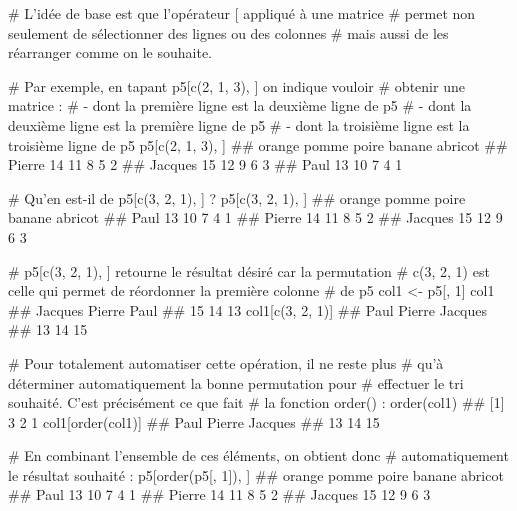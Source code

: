 \documentclass[12pt,twosided, notitlepage]{book}
\newenvironment{Shaded}{}{}
\newcommand{\KeywordTok}[1]{\textcolor[rgb]{0.00,0.00,1.00}{{#1}}}
\newcommand{\DecValTok}[1]{{#1}}
\newcommand{\StringTok}[1]{\textcolor[rgb]{0.00,0.50,0.50}{{#1}}}
\newcommand{\CommentTok}[1]{\textcolor[rgb]{0.00,0.50,0.00}{{#1}}}
\newcommand{\NormalTok}[1]{{#1}}
\renewenvironment{Shaded}{\begin{snugshade}}{\end{snugshade}}
\begin{document}
\begin{enumerate}
\begin{Shaded}
\begin{Highlighting}[]
\CommentTok{# L'idée de base est que l'opérateur [ appliqué à une matrice}
\CommentTok{# permet non seulement de sélectionner des lignes ou des colonnes}
\CommentTok{# mais aussi de les réarranger comme on le souhaite.}

\CommentTok{# Par exemple, en tapant p5[c(2, 1, 3), ] on indique vouloir}
\CommentTok{# obtenir une matrice : }
\CommentTok{# - dont la première ligne est la deuxième ligne de p5}
\CommentTok{# - dont la deuxième ligne est la première ligne de p5}
\CommentTok{# - dont la troisième ligne est la troisième ligne de p5}
\NormalTok{p5[}\KeywordTok{c}\NormalTok{(}\DecValTok{2}\NormalTok{, }\DecValTok{1}\NormalTok{, }\DecValTok{3}\NormalTok{), ]}
  \NormalTok{##         orange pomme poire banane abricot}
  \NormalTok{## Pierre      14    11     8      5       2}
  \NormalTok{## Jacques     15    12     9      6       3}
  \NormalTok{## Paul        13    10     7      4       1}

\CommentTok{# Qu'en est-il de p5[c(3, 2, 1), ] ? }
\NormalTok{p5[}\KeywordTok{c}\NormalTok{(}\DecValTok{3}\NormalTok{, }\DecValTok{2}\NormalTok{, }\DecValTok{1}\NormalTok{), ]}
  \NormalTok{##         orange pomme poire banane abricot}
  \NormalTok{## Paul        13    10     7      4       1}
  \NormalTok{## Pierre      14    11     8      5       2}
  \NormalTok{## Jacques     15    12     9      6       3}

\CommentTok{# p5[c(3, 2, 1), ] retourne le résultat désiré car la permutation}
\CommentTok{# c(3, 2, 1) est celle qui permet de réordonner la première colonne}
\CommentTok{# de p5}
\NormalTok{col1 <-}\StringTok{ }\NormalTok{p5[, }\DecValTok{1}\NormalTok{]}
\NormalTok{col1}
  \NormalTok{## Jacques  Pierre    Paul }
  \NormalTok{##      15      14      13}
\NormalTok{col1[}\KeywordTok{c}\NormalTok{(}\DecValTok{3}\NormalTok{, }\DecValTok{2}\NormalTok{, }\DecValTok{1}\NormalTok{)]}
  \NormalTok{##    Paul  Pierre Jacques }
  \NormalTok{##      13      14      15}

\CommentTok{# Pour totalement automatiser cette opération, il ne reste plus}
\CommentTok{# qu'à déterminer automatiquement la bonne permutation pour }
\CommentTok{# effectuer le tri souhaité. C'est précisément ce que fait}
\CommentTok{# la fonction order() : }
\KeywordTok{order}\NormalTok{(col1)}
  \NormalTok{## [1] 3 2 1}
\NormalTok{col1[}\KeywordTok{order}\NormalTok{(col1)]}
  \NormalTok{##    Paul  Pierre Jacques }
  \NormalTok{##      13      14      15}

\CommentTok{# En combinant l'ensemble de ces éléments, on obtient donc}
\CommentTok{# automatiquement le résultat souhaité : }
\NormalTok{p5[}\KeywordTok{order}\NormalTok{(p5[, }\DecValTok{1}\NormalTok{]), ]}
  \NormalTok{##         orange pomme poire banane abricot}
  \NormalTok{## Paul        13    10     7      4       1}
  \NormalTok{## Pierre      14    11     8      5       2}
  \NormalTok{## Jacques     15    12     9      6       3}
\end{Highlighting}
\end{Shaded}


\end{enumerate}
\end{document}
